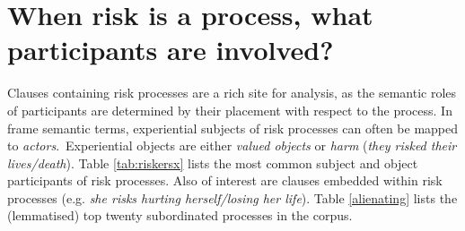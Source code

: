 \section{When risk is a process, what participants are involved?} \FloatBarrier
    
    Clauses containing risk processes are a rich site for analysis, as the semantic roles of participants are determined by their placement with respect to the process. In frame semantic terms, experiential subjects of risk processes can often be mapped to \emph{actors}.~Experiential objects are either \emph{valued objects} or \emph{harm} (\emph{they risked their lives/death}). Table \ref{tab:riskersx} lists the most common subject and object participants of risk processes. Also of interest are clauses embedded within risk processes (e.g. \emph{she risks hurting herself\slash losing her life}). Table \ref{alienating} lists the (lemmatised) top twenty subordinated processes in the corpus.

